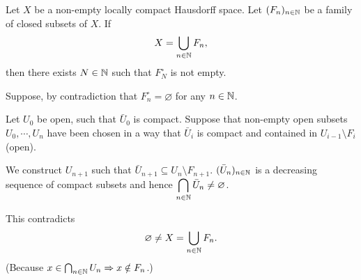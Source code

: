 \begin{propositionenv}\label{prop:5.3.9}
    Let $X$ be a non-empty locally compact Hausdorff space.
    Let $(F_n)_{n\in \mathbb{N}}$ be a family of closed subsets of $X$.
    If 
    $$X = \bigcup_{n \in \mathbb{N}} F_n,$$
    then there exists $N \in \mathbb{N}$ such that $F_{N}^{\circ}$ is not empty.
\end{propositionenv}
\begin{proofenv}
    Suppose, by contradiction that $F^{\circ}_{n} = \varnothing$ for any $n \in \mathbb{N}$.
    
    \quad Let $U_0$ be open, such that $\bar{U}_0$ is compact.
    Suppose that non-empty open subsets $U_0,\cdots,U_n$ have been chosen in a way that $\bar{U}_{i}$ is compact and contained in $U_{i-1}\setminus F_{i}$ (open).
    
    \quad We construct $U_{n+1}$ such that $\bar{U}_{n+1} \subseteq U_{n}\setminus F_{n+1}$.
    $(\bar{U}_{n})_{n \in \mathbb{N}}$ is a decreasing sequence of compact subsets and hence $\displaystyle \bigcap_{n \in \mathbb{N}} \bar{U}_{n} \neq \varnothing$.
    
    \quad This contradicts
    $$\varnothing \neq X = \bigcup_{n \in \mathbb{N}} F_n.$$
    (Because $x \in \bigcap_{n \in \mathbb{N}} U_n \Rightarrow x \notin F_{n}$.)
\end{proofenv}

